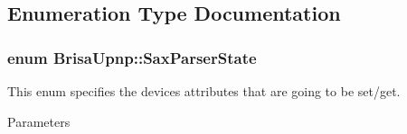 \subsection{Enumeration Type Documentation}
\hypertarget{namespaceBrisaUpnp_a73e019fb9c2f13e86a645f4b2812eca0}{
\subsubsection[{SaxParserState}]{\setlength{\rightskip}{0pt plus 5cm}enum {\bf BrisaUpnp::SaxParserState}}}
\label{namespaceBrisaUpnp_a73e019fb9c2f13e86a645f4b2812eca0}


This enum specifies the devices attributes that are going to be set/get. 
\begin{DoxyParams}{Parameters}

\end{DoxyParams}

